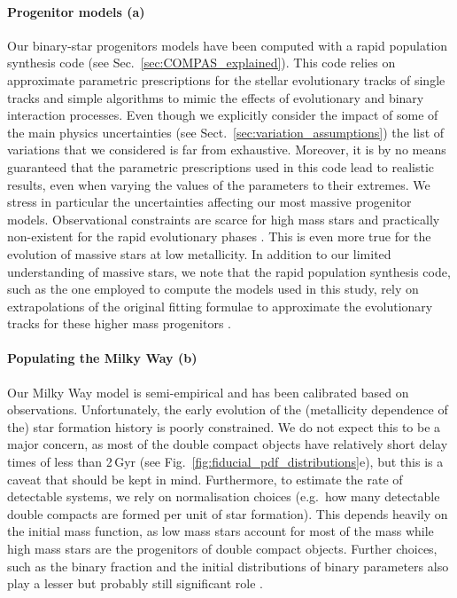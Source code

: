 \paragraph{Progenitor models (a)} Our binary-star progenitors models have been computed with a rapid population synthesis code (see Sec.~\ref{sec:COMPAS_explained}). This code relies on approximate parametric prescriptions for the stellar evolutionary tracks of single tracks and simple algorithms to mimic the effects of evolutionary and binary interaction  processes. Even though we explicitly consider the impact of some of the main physics uncertainties (see Sect.~\ref{sec:variation_assumptions}) the list of variations that we considered is far from exhaustive. Moreover, it is by no means guaranteed that the parametric prescriptions used in this code lead to realistic results, even when varying the values of the parameters to their extremes. We stress in particular the uncertainties affecting our most massive progenitor models. Observational constraints are scarce for high mass stars and practically non-existent for the rapid evolutionary phases \citep[e.g.][]{Langer2012, Mapelli+2021}. This is even more true for the evolution of massive stars at low metallicity. In addition to our limited understanding of massive stars, we note that the rapid population synthesis code, such as the one employed to compute the models used in this study, rely on extrapolations of the original fitting formulae to approximate the evolutionary tracks for these higher mass progenitors \citep{Hurley+2000,Hurley+2002}. 
 
\paragraph{Populating the Milky Way (b)} Our Milky Way model is semi-empirical and has been calibrated based on observations. Unfortunately, the early evolution of the (metallicity dependence of the) star formation history is poorly constrained. We do not expect this to be a major concern, as most of the double compact objects have relatively short delay times of less than 2\,Gyr (see Fig.~\ref{fig:fiducial_pdf_distributions}e), but this is a caveat that should be kept in mind. Furthermore, to estimate the rate of detectable systems, we rely on normalisation choices (e.g.\ how many detectable double compacts are formed per unit of star formation). This depends heavily on the initial mass function, as low mass stars account for most of the mass while high mass stars are the progenitors of double compact objects. Further choices, such as the binary fraction and the initial distributions of binary parameters also play a lesser but probably still significant role \citet[e.g.\ ][]{deMink+2015, Chruslinska+2017, Klencki+2018}. 

